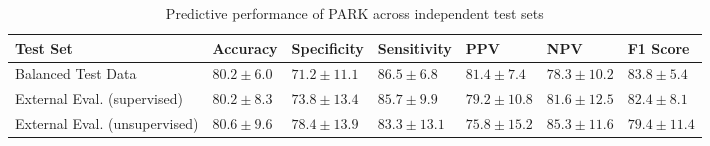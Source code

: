 \begin{table}
\caption{Predictive performance of PARK across independent test sets}
\label{tab:performance_summary}
\begin{tabular}{lllllll}
\toprule
Test Set & Accuracy & Specificity & Sensitivity & PPV & NPV & F1 Score \\
\midrule
Balanced Test Data  & $80.2 \pm 6.0$ & $71.2 \pm 11.1$ & $86.5 \pm 6.8$ & $81.4 \pm 7.4$ & $78.3 \pm 10.2$ & $83.8 \pm 5.4$ \\
External Eval. (supervised) & $80.2 \pm 8.3$ & $73.8 \pm 13.4$ & $85.7 \pm 9.9$ & $79.2 \pm 10.8$ & $81.6 \pm 12.5$ & $82.4 \pm 8.1$ \\
External Eval. (unsupervised) & $80.6 \pm 9.6$ & $78.4 \pm 13.9$ & $83.3 \pm 13.1$ & $75.8 \pm 15.2$ & $85.3 \pm 11.6$ & $79.4 \pm 11.4$ \\
\bottomrule
\end{tabular}
\end{table}
